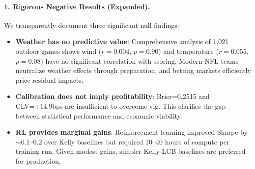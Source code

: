 \begin{center}
\end{center}

\paragraph{1. Rigorous Negative Results (Expanded).}
We transparently document three significant null findings:
\begin{itemize}
  \item \textbf{Weather has no predictive value}: Comprehensive analysis of 1,021 outdoor games shows wind ($r=0.004$, $p=0.90$) and temperature ($r=0.055$, $p=0.08$) have no significant correlation with scoring. Modern NFL teams neutralize weather effects through preparation, and betting markets efficiently price residual impacts.
  \item \textbf{Calibration does not imply profitability}: Brier=0.2515 and CLV=+14.9bps are insufficient to overcome vig. This clarifies the gap between statistical performance and economic viability.
  \item \textbf{RL provides marginal gains}: Reinforcement learning improved Sharpe by $\sim$0.1--0.2 over Kelly baselines but required 10--40 hours of compute per training run. Given modest gains, simpler Kelly-LCB baselines are preferred for production.
\end{itemize}

